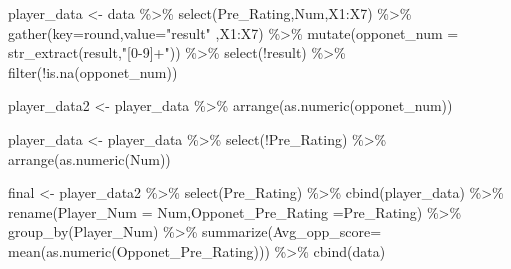 \documentclass[
]{article}
\newenvironment{Shaded}{\begin{snugshade}}{\end{snugshade}}
\newcommand{\AttributeTok}[1]{\textcolor[rgb]{0.77,0.63,0.00}{#1}}
\newcommand{\FunctionTok}[1]{\textcolor[rgb]{0.00,0.00,0.00}{#1}}
\newcommand{\NormalTok}[1]{#1}
\newcommand{\OtherTok}[1]{\textcolor[rgb]{0.56,0.35,0.01}{#1}}
\newcommand{\SpecialCharTok}[1]{\textcolor[rgb]{0.00,0.00,0.00}{#1}}
\newcommand{\StringTok}[1]{\textcolor[rgb]{0.31,0.60,0.02}{#1}}
\begin{document}
\begin{Shaded}
\begin{Highlighting}[]
\NormalTok{player\_data }\OtherTok{\textless{}{-}}\NormalTok{ data }\SpecialCharTok{\%\textgreater{}\%}
   \FunctionTok{select}\NormalTok{(Pre\_Rating,Num,X1}\SpecialCharTok{:}\NormalTok{X7) }\SpecialCharTok{\%\textgreater{}\%}
  \FunctionTok{gather}\NormalTok{(}\AttributeTok{key=}\StringTok{\textquotesingle{}round\textquotesingle{}}\NormalTok{,}\AttributeTok{value=}\StringTok{"result"}\NormalTok{ ,X1}\SpecialCharTok{:}\NormalTok{X7) }\SpecialCharTok{\%\textgreater{}\%}
  \FunctionTok{mutate}\NormalTok{(}\AttributeTok{opponet\_num =} \FunctionTok{str\_extract}\NormalTok{(result,}\StringTok{"[0{-}9]+"}\NormalTok{)) }\SpecialCharTok{\%\textgreater{}\%}
  \FunctionTok{select}\NormalTok{(}\SpecialCharTok{!}\NormalTok{result) }\SpecialCharTok{\%\textgreater{}\%}
  \FunctionTok{filter}\NormalTok{(}\SpecialCharTok{!}\FunctionTok{is.na}\NormalTok{(opponet\_num))}


\NormalTok{player\_data2 }\OtherTok{\textless{}{-}}\NormalTok{ player\_data  }\SpecialCharTok{\%\textgreater{}\%}
    \FunctionTok{arrange}\NormalTok{(}\FunctionTok{as.numeric}\NormalTok{(opponet\_num)) }


\NormalTok{player\_data }\OtherTok{\textless{}{-}}\NormalTok{ player\_data  }\SpecialCharTok{\%\textgreater{}\%}
  \FunctionTok{select}\NormalTok{(}\SpecialCharTok{!}\NormalTok{Pre\_Rating) }\SpecialCharTok{\%\textgreater{}\%}
    \FunctionTok{arrange}\NormalTok{(}\FunctionTok{as.numeric}\NormalTok{(Num)) }


\NormalTok{final }\OtherTok{\textless{}{-}}\NormalTok{ player\_data2 }\SpecialCharTok{\%\textgreater{}\%}
  \FunctionTok{select}\NormalTok{(Pre\_Rating) }\SpecialCharTok{\%\textgreater{}\%}
  \FunctionTok{cbind}\NormalTok{(player\_data)  }\SpecialCharTok{\%\textgreater{}\%}
  \FunctionTok{rename}\NormalTok{(}\AttributeTok{Player\_Num =}\NormalTok{ Num,}\AttributeTok{Opponet\_Pre\_Rating =}\NormalTok{Pre\_Rating) }\SpecialCharTok{\%\textgreater{}\%}
\FunctionTok{group\_by}\NormalTok{(Player\_Num) }\SpecialCharTok{\%\textgreater{}\%}
  \FunctionTok{summarize}\NormalTok{(}\AttributeTok{Avg\_opp\_score=} \FunctionTok{mean}\NormalTok{(}\FunctionTok{as.numeric}\NormalTok{(Opponet\_Pre\_Rating))) }\SpecialCharTok{\%\textgreater{}\%}
  \FunctionTok{cbind}\NormalTok{(data)}
\end{Highlighting}
\end{Shaded}
\end{document}
